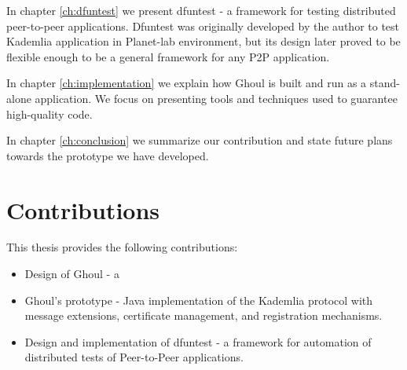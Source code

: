 In chapter \ref{ch:dfuntest} we present dfuntest - a framework for testing
distributed peer-to-peer applications.
Dfuntest was originally developed by the author to test Kademlia application in
Planet-lab environment, but its design later proved to be flexible enough to be
a general framework for any P2P application.

In chapter \ref{ch:implementation} we explain how Ghoul is built and run as a
stand-alone application.
We focus on presenting tools and techniques used to guarantee high-quality code.

In chapter \ref{ch:conclusion} we summarize our contribution and state future
plans towards the prototype we have developed.

\section{Contributions}
This thesis provides the following contributions:
\begin{itemize}
  \item Design of Ghoul - a 
  \item Ghoul's prototype - Java implementation of the Kademlia protocol with
    message extensions, certificate management, and registration mechanisms.
  \item Design and implementation of dfuntest - a framework for automation of
    distributed tests of Peer-to-Peer applications.
\end{itemize}
